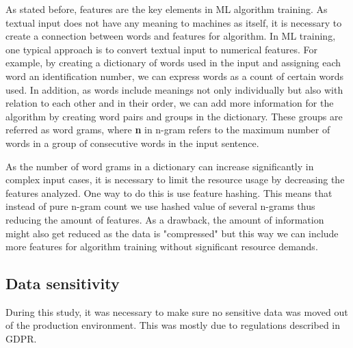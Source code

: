 As stated before, %
features are the key elements in ML algorithm training.
As textual input does not have any meaning to machines as itself,
it is necessary to create a connection between words and features for algorithm.
In ML training, one typical approach is to convert textual input to numerical features.
For example, by creating a dictionary of words used in the input
and assigning each word an identification number,
we can express words as a count of certain words used.
In addition,
as words include meanings not only individually but also
with relation to each other and in their order, %
we can add more information for the algorithm
by creating word pairs and groups in the dictionary.
These groups are referred as word grams,
where \textbf{n} in n-gram refers to the maximum number of words
in a group of consecutive words in the input sentence.



As the number of word grams in a dictionary can increase significantly
in complex input cases,
it is necessary to limit the resource usage by decreasing the features analyzed.
One way to do this is use feature hashing.
This means that instead of pure n-gram count
we use hashed value of several n-grams
thus reducing the amount of features.
As a drawback,
the amount of information might also get reduced as the data is "compressed"
but this way we can include more features for algorithm training
without significant resource demands.



\subsection{Data sensitivity}\label{subsec:bg-data-sensitivity}

During this study,
it was necessary to make sure no sensitive data
was moved out of the production environment.
This was mostly due to regulations described in GDPR. %

